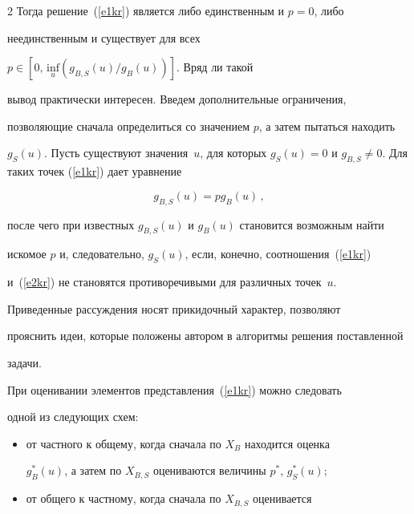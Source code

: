 \begin{multicols}{2}
     Тогда решение~(\ref{e1kr}) является либо единственным и $p=0$, либо 


     неединственным и существует для всех 


     $p\in [0,\,\underset{u}{\mathrm{inf}} (g_{B,S}(u)/g_B(u))]$. Вряд ли такой 


вывод практически интересен. Введем дополнительные ограничения, 


позволяющие сначала определиться со значением $p$, а затем пытаться находить 


$g_S(u)$. Пусть существуют значения~$u$, для которых $g_S(u)=0$ и $g_{B,S} 


\not= 0$. Для таких точек (\ref{e1kr}) дает уравнение


     \begin{equation} %


     g_{B,S}(u) =pg_B(u)\,,


     \label{e2kr}


     \end{equation}


после чего при известных $g_{B,S}(u)$ и $g_B(u)$ становится возможным найти 


искомое $p$ и, следовательно, $g_S(u)$, если, конечно, соотношения~(\ref{e1kr}) 


и~(\ref{e2kr}) не становятся противоречивыми для различных точек~$u$.


     


     Приведенные рассуждения носят прикидочный характер, позволяют 


прояснить идеи, которые положены автором в алгоритмы решения поставленной 


задачи.


     


     При оценивании элементов представления~(\ref{e1kr}) можно следовать 


одной из следующих схем:


     \begin{itemize}


\item от частного к общему, когда сначала по $X_B$ находится оценка 


$g_B^*(u)$, а затем по $X_{B,S}$ оцениваются величины  $p^*$, $g_S^*(u)$;


\item от общего к частному, когда сначала по $X_{B,S}$ оценивается 



\end{itemize}
\end{multicols}
